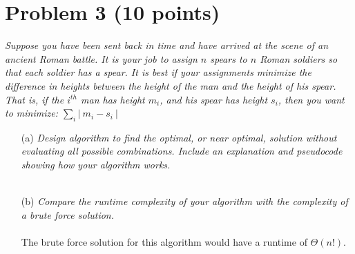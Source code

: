 \documentclass[12pt]{article}
\begin{document}
{\section*{{\selectfont Problem 3 (10 points)}}\vspace{-10mm}
\textsl{Suppose you have been sent back in time and have arrived at the scene of an ancient Roman battle. It is your job to assign $n$ spears to $n$ Roman soldiers so that each soldier has a spear. It is best if your assignments minimize the difference in heights between the height of the man and the height of his spear. That is, if the $i^{th}$ man has height $m_i$, and his spear has height $s_i$, then you want to minimize: $\sum_{i} \left| ~ m_i - s_i ~ \right|$}
\begin{enumerate}
\item[(a)]\textsl{Design algorithm to find the optimal, or near optimal, solution without evaluating all possible combinations. Include an explanation and pseudocode showing how your algorithm works.}\\ \\
\item[(b)]\textsl{Compare the runtime complexity of your algorithm with the complexity of a brute force solution.}\\ \\
The brute force solution for this algorithm would have a runtime of $\Theta(n!)$.
\end{enumerate}

}
\end{document}
